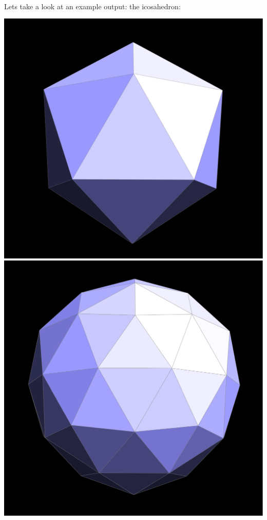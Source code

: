 \documentclass{article}
\begin{document}
\\
Lets take a look at an example output: the icosahedron:
\begin{center}
    \includegraphics[]{task 6/iso1.png}
    \includegraphics[]{task 6/iso2.png}

\end{center}
\end{document}
